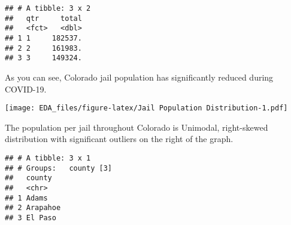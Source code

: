 \documentclass[
]{article}
\newenvironment{Shaded}{\begin{snugshade}}{\end{snugshade}}
\newcommand{\CommentTok}[1]{\textcolor[rgb]{0.56,0.35,0.01}{\textit{#1}}}
\newcommand{\DataTypeTok}[1]{\textcolor[rgb]{0.13,0.29,0.53}{#1}}
\newcommand{\DecValTok}[1]{\textcolor[rgb]{0.00,0.00,0.81}{#1}}
\newcommand{\KeywordTok}[1]{\textcolor[rgb]{0.13,0.29,0.53}{\textbf{#1}}}
\newcommand{\NormalTok}[1]{#1}
\newcommand{\OperatorTok}[1]{\textcolor[rgb]{0.81,0.36,0.00}{\textbf{#1}}}
\newcommand{\StringTok}[1]{\textcolor[rgb]{0.31,0.60,0.02}{#1}}
\begin{document}
\begin{verbatim}
## # A tibble: 3 x 2
##   qtr     total
##   <fct>   <dbl>
## 1 1     182537.
## 2 2     161983.
## 3 3     149324.
\end{verbatim}

As you can see, Colorado jail population has significantly reduced
during COVID-19.

\begin{Shaded}
\end{Shaded}

\texttt{[image: EDA\_files/figure-latex/Jail Population Distribution-1.pdf]}

The population per jail throughout Colorado is Unimodal, right-skewed
distribution with significant outliers on the right of the graph.

\begin{Shaded}
\end{Shaded}

\begin{verbatim}
## # A tibble: 3 x 1
## # Groups:   county [3]
##   county  
##   <chr>   
## 1 Adams   
## 2 Arapahoe
## 3 El Paso
\end{verbatim}
\end{document}
